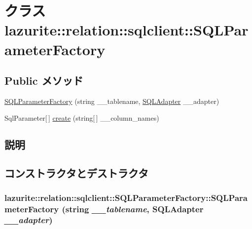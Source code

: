 \hypertarget{classlazurite_1_1relation_1_1sqlclient_1_1_s_q_l_parameter_factory}{
\section{クラス lazurite::relation::sqlclient::SQLParameterFactory}
\label{classlazurite_1_1relation_1_1sqlclient_1_1_s_q_l_parameter_factory}
}
\subsection*{Public メソッド}
\begin{DoxyCompactItemize}
\item 
\hyperlink{classlazurite_1_1relation_1_1sqlclient_1_1_s_q_l_parameter_factory_a6adc66785cef31e9df1ccc477f27a350}{SQLParameterFactory} (string \_\-\_\-tablename, \hyperlink{interfacelazurite_1_1relation_1_1sqlclient_1_1_s_q_l_adapter}{SQLAdapter} \_\-\_\-adapter)
\item 
SqlParameter\mbox{[}$\,$\mbox{]} \hyperlink{classlazurite_1_1relation_1_1sqlclient_1_1_s_q_l_parameter_factory_ad23e836342c3266b575a3004448ff1fc}{create} (string\mbox{[}$\,$\mbox{]} \_\-\_\-column\_\-names)
\end{DoxyCompactItemize}


\subsection{説明}


\subsection{コンストラクタとデストラクタ}
\hypertarget{classlazurite_1_1relation_1_1sqlclient_1_1_s_q_l_parameter_factory_a6adc66785cef31e9df1ccc477f27a350}{
\subsubsection[{SQLParameterFactory}]{\setlength{\rightskip}{0pt plus 5cm}lazurite::relation::sqlclient::SQLParameterFactory::SQLParameterFactory (string {\em \_\-\_\-tablename}, \/  {\bf SQLAdapter} {\em \_\-\_\-adapter})}}
\label{classlazurite_1_1relation_1_1sqlclient_1_1_s_q_l_parameter_factory_a6adc66785cef31e9df1ccc477f27a350}

